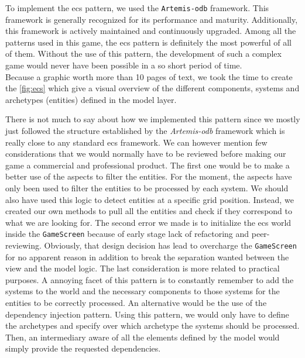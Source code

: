 
To implement the \gls{ecs} pattern, we used the \texttt{Artemis-odb} framework.\cite{artemis-odb} This framework is generally recognized for its performance and maturity. Additionally, this framework is actively maintained and continuously upgraded. Among all the patterns used in this game, the \gls{ecs} pattern is definitely the most powerful of all of them. Without the use of this pattern, the development of such a complex game would never have been possible in a so short period of time. \\

Because a graphic worth more than 10 pages of text, we took the time to create the \autoref{fig:ecs} which give a visual overview of the different components, systems and archetypes (entities) defined in the model layer.


There is not much to say about how we implemented this pattern since we mostly just followed the structure established by the \textit{Artemis-odb} framework which is really close to any standard \gls{ecs} framework. We can however mention few considerations that we would normally have to be reviewed before making our game a commercial and professional product. The first one would be to make a better use of the aspects to filter the entities. For the moment, the aspects have only been used to filter the entities to be processed by each system. We should also have used this logic to detect entities at a specific grid position. Instead, we created our own methods to pull all the entities and check if they correspond to what we are looking for. The second error we made is to initialize the \gls{ecs} world inside the \texttt{GameScreen} because of early stage lack of refactoring and peer-reviewing. Obviously, that design decision has lead to overcharge the \texttt{GameScreen} for no apparent reason in addition to break the separation wanted between the view and the model logic. The last consideration is more related to practical purposes. A annoying facet of this pattern is to constantly remember to add the systems to the world and the necessary components to those systems for the entities to be correctly processed. An alternative would be the use of the dependency injection pattern. Using this pattern, we would only have to define the archetypes and specify over which archetype the systems should be processed. Then, an intermediary aware of all the elements defined by the model would simply provide the requested dependencies. \cite{wiki:dependenciesInjection}

